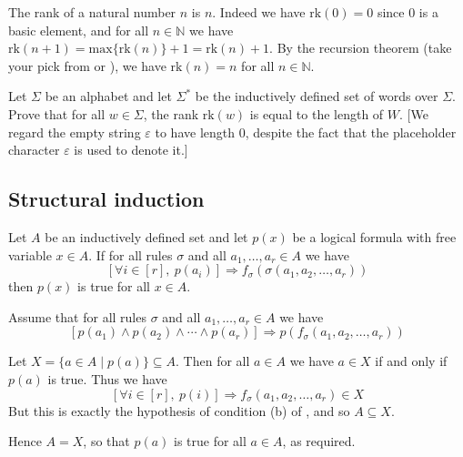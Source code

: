 \begin{example}
The rank of a natural number $n$ is $n$. Indeed we have $\mathrm{rk}(0) = 0$ since $0$ is a basic element, and for all $n \in \mathbb{N}$ we have $\mathrm{rk}(n+1) = \mathrm{max} \{ \mathrm{rk}(n) \} + 1 = \mathrm{rk}(n) + 1$. By the recursion theorem (take your pick from  or ), we have $\mathrm{rk}(n) = n$ for all $n \in \mathbb{N}$.
\end{example}

\begin{exercise}
Let $\Sigma$ be an alphabet and let $\Sigma^*$ be the inductively defined set of words over $\Sigma$. Prove that for all $w \in \Sigma$, the rank $\mathrm{rk}(w)$ is equal to the length of $W$. [We regard the empty string $\varepsilon$ to have length $0$, despite the fact that the placeholder character $\varepsilon$ is used to denote it.]
\end{exercise}

\subsection*{Structural induction}

\todo{}

\begin{theorem}
\label{thmStructuralInduction}
Let $A$ be an inductively defined set and let $p(x)$ be a logical formula with free variable $x \in A$. If for all rules $\sigma$ and all $a_1,\dots,a_r \in A$ we have
\[ [\forall i \in [r],~ p(a_i)] \Rightarrow f_{\sigma}(\sigma(a_1,a_2,\dots,a_r)) \]
then $p(x)$ is true for all $x \in A$.
\end{theorem}

\begin{cproof}
Assume that for all rules $\sigma$ and all $a_1,\dots,a_r \in A$ we have
\[ [p(a_1) \wedge p(a_2) \wedge \cdots \wedge p(a_r)] \Rightarrow p(f_{\sigma}(a_1,a_2,\dots,a_r)) \]

Let $X = \{ a \in A \mid p(a) \} \subseteq A$. Then for all $a \in A$ we have $a \in X$ if and only if $p(a)$ is true. Thus we have
\[ [\forall i \in [r],~ p(i)] \Rightarrow f_{\sigma}(a_1,a_2,\dots,a_r) \in X \]
But this is exactly the hypothesis of condition (b) of , and so $A \subseteq X$.

Hence $A = X$, so that $p(a)$ is true for all $a \in A$, as required.
\end{cproof}

